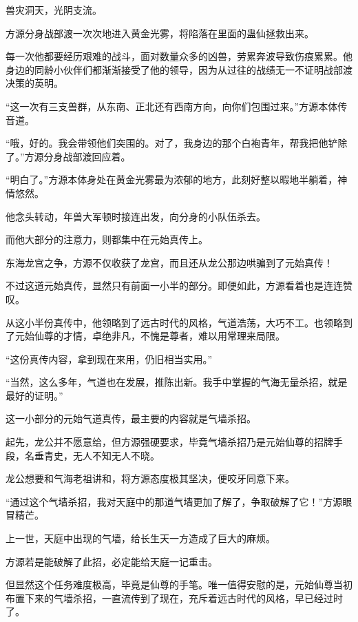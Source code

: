 
\begin{this_body}

兽灾洞天，光阴支流。

方源分身战部渡一次次地进入黄金光雾，将陷落在里面的蛊仙拯救出来。

每一次他都要经历艰难的战斗，面对数量众多的凶兽，劳累奔波导致伤痕累累。他身边的同龄小伙伴们都渐渐接受了他的领导，因为从过往的战绩无一不证明战部渡决策的英明。

“这一次有三支兽群，从东南、正北还有西南方向，向你们包围过来。”方源本体传音道。

“哦，好的。我会带领他们突围的。对了，我身边的那个白袍青年，帮我把他铲除了。”方源分身战部渡回应着。

“明白了。”方源本体身处在黄金光雾最为浓郁的地方，此刻好整以暇地半躺着，神情悠然。

他念头转动，年兽大军顿时接连出发，向分身的小队伍杀去。

而他大部分的注意力，则都集中在元始真传上。

东海龙宫之争，方源不仅收获了龙宫，而且还从龙公那边哄骗到了元始真传！

不过这道元始真传，显然只有前面一小半的部分。即便如此，方源看着也是连连赞叹。

从这小半份真传中，他领略到了远古时代的风格，气道浩荡，大巧不工。也领略到了元始仙尊的才情，卓绝非凡，不愧是尊者，难以用常理来局限。

“这份真传内容，拿到现在来用，仍旧相当实用。”

“当然，这么多年，气道也在发展，推陈出新。我手中掌握的气海无量杀招，就是最好的证明。”

这一小部分的元始气道真传，最主要的内容就是气墙杀招。

起先，龙公并不愿意给，但方源强硬要求，毕竟气墙杀招乃是元始仙尊的招牌手段，名垂青史，无人不知无人不晓。

龙公想要和气海老祖讲和，将方源态度极其坚决，便咬牙同意下来。

“通过这个气墙杀招，我对天庭中的那道气墙更加了解了，争取破解了它！”方源眼冒精芒。

上一世，天庭中出现的气墙，给长生天一方造成了巨大的麻烦。

方源若是能破解了此招，必定能给天庭一记重击。

但显然这个任务难度极高，毕竟是仙尊的手笔。唯一值得安慰的是，元始仙尊当初布置下来的气墙杀招，一直流传到了现在，充斥着远古时代的风格，早已经过时了。


\end{this_body}
